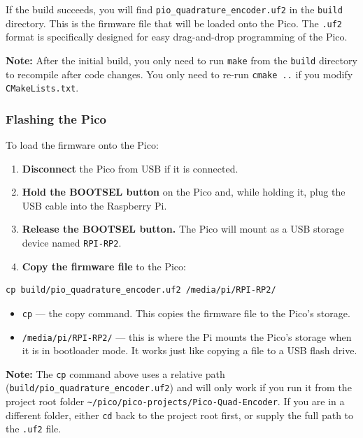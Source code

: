 \documentclass[main.tex]{subfiles}
\begin{document}
\noindent If the build succeeds, you will find \texttt{pio\_quadrature\_encoder.uf2} in the \texttt{build} directory. This is the firmware file that will be loaded onto the Pico. The \texttt{.uf2} format is specifically designed for easy drag-and-drop programming of the Pico.

\vspace{6pt}
\noindent \textbf{Note:} After the initial build, you only need to run \texttt{make} from the \texttt{build} directory to recompile after code changes. You only need to re-run \texttt{cmake ..} if you modify \texttt{CMakeLists.txt}.

\subsubsection{Flashing the Pico}

To load the firmware onto the Pico:

\begin{enumerate}
    \item \textbf{Disconnect} the Pico from USB if it is connected.
    \item \textbf{Hold the BOOTSEL button} on the Pico and, while holding it, plug the USB cable into the Raspberry Pi.
    \item \textbf{Release the BOOTSEL button.} The Pico will mount as a USB storage device named \texttt{RPI-RP2}.
    \item \textbf{Copy the firmware file} to the Pico:
\end{enumerate}

\begin{verbatim}
cp build/pio_quadrature_encoder.uf2 /media/pi/RPI-RP2/
\end{verbatim}

\begin{itemize}
    \item \texttt{cp} --- the copy command. This copies the firmware file to the Pico's storage.
    \item \texttt{/media/pi/RPI-RP2/} --- this is where the Pi mounts the Pico's storage when it is in bootloader mode. It works just like copying a file to a USB flash drive.
\end{itemize}

\vspace{6pt}
\noindent \textbf{Note:} The \texttt{cp} command above uses a relative path (\texttt{build/pio\_quadrature\_encoder.uf2}) and will only work if you run it from the project root folder \texttt{\textasciitilde/pico/pico-projects/Pico-Quad-Encoder}. If you are in a different folder, either \texttt{cd} back to the project root first, or supply the full path to the \texttt{.uf2} file.
\end{document}
